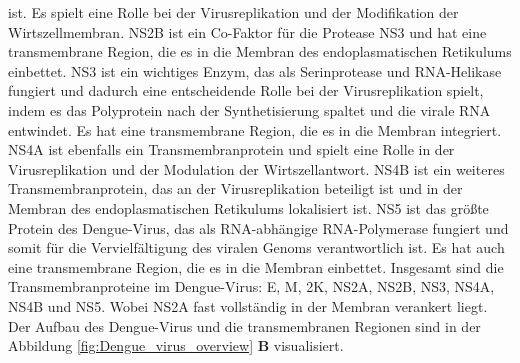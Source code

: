 \documentclass[german,version-2022-01]{uzl-thesis}
\begin{document}
ist. Es spielt eine Rolle bei der Virusreplikation und der Modifikation der Wirtszellmembran. NS2B ist ein Co-Faktor f\"ur die Protease NS3 und hat eine transmembrane Region, die es in die Membran des endoplasmatischen Retikulums einbettet. NS3 ist ein wichtiges Enzym, das als Serinprotease und RNA-Helikase fungiert und dadurch eine entscheidende Rolle bei der Virusreplikation spielt, indem es das Polyprotein nach der Synthetisierung spaltet und die virale RNA entwindet. Es hat eine transmembrane Region, die es in die Membran integriert. NS4A ist ebenfalls ein Transmembranprotein und spielt eine Rolle in der Virusreplikation und der Modulation der Wirtszellantwort. NS4B ist ein weiteres Transmembranprotein, das an der Virusreplikation beteiligt ist und in der Membran des endoplasmatischen Retikulums lokalisiert ist. NS5 ist das gr\"o\ss{}te Protein des Dengue-Virus, das als RNA-abh\"angige RNA-Polymerase fungiert und somit f\"ur die Vervielf\"altigung des viralen Genoms verantwortlich ist. Es hat auch eine transmembrane Region, die es in die Membran einbettet.
Insgesamt sind die Transmembranproteine im Dengue-Virus: E, M, 2K, NS2A, NS2B, NS3, NS4A, NS4B und NS5. Wobei NS2A fast vollst\"andig in der Membran verankert liegt. Der Aufbau des Dengue-Virus und die transmembranen Regionen sind in der Abbildung \ref{fig:Dengue_virus_overview} \textbf{B} visualisiert. 
\end{document}
